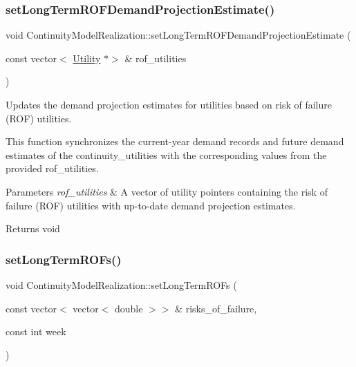 \subsubsection{\texorpdfstring{set\+Long\+Term\+R\+O\+F\+Demand\+Projection\+Estimate()}{setLongTermROFDemandProjectionEstimate()}}
{\footnotesize\ttfamily void Continuity\+Model\+Realization\+::set\+Long\+Term\+R\+O\+F\+Demand\+Projection\+Estimate (\begin{DoxyParamCaption}\item[{const vector$<$ \mbox{\hyperlink{classUtility}{Utility}} $\ast$$>$ \&}]{rof\+\_\+utilities }\end{DoxyParamCaption})}



Updates the demand projection estimates for utilities based on risk of failure (R\+OF) utilities. 

This function synchronizes the current-\/year demand records and future demand estimates of the {\ttfamily continuity\+\_\+utilities} with the corresponding values from the provided {\ttfamily rof\+\_\+utilities}.


\begin{DoxyParams}{Parameters}
{\em rof\+\_\+utilities} & A vector of utility pointers containing the risk of failure (R\+OF) utilities with up-\/to-\/date demand projection estimates.\\
\hline
\end{DoxyParams}
\begin{DoxyReturn}{Returns}
void 
\end{DoxyReturn}
\mbox{\label{classContinuityModelRealization_aa0168985144d26e1613cf20335affedb}} 
\subsubsection{\texorpdfstring{set\+Long\+Term\+R\+O\+Fs()}{setLongTermROFs()}}
{\footnotesize\ttfamily void Continuity\+Model\+Realization\+::set\+Long\+Term\+R\+O\+Fs (\begin{DoxyParamCaption}\item[{const vector$<$ vector$<$ double $>$$>$ \&}]{risks\+\_\+of\+\_\+failure,  }\item[{const int}]{week }\end{DoxyParamCaption})}



